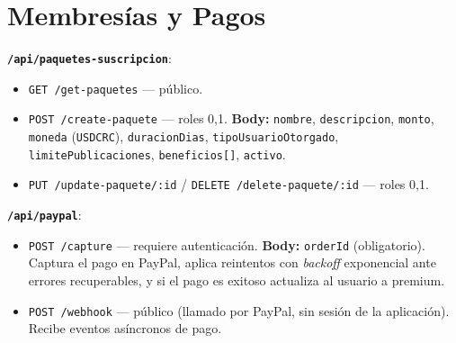 \section{Membresías y Pagos}
\textbf{\texttt{/api/paquetes-suscripcion}}:
\begin{itemize}
    \item \texttt{GET /get-paquetes} — público.
    \item \texttt{POST /create-paquete} — roles 0,1. \textbf{Body:} \texttt{nombre}, \texttt{descripcion}, \texttt{monto}, \texttt{moneda} (\texttt{USD}\textbar\texttt{CRC}), \texttt{duracionDias}, \texttt{tipoUsuarioOtorgado}, \texttt{limitePublicaciones}, \texttt{beneficios[]}, \texttt{activo}.
    \item \texttt{PUT /update-paquete/:id} / \texttt{DELETE /delete-paquete/:id} — roles 0,1.
\end{itemize}
\textbf{\texttt{/api/paypal}}:
\begin{itemize}
    \item \texttt{POST /capture} — requiere autenticación. \textbf{Body:} \texttt{orderId} (obligatorio). Captura el pago en PayPal, aplica reintentos con \textit{backoff} exponencial ante errores recuperables, y si el pago es exitoso actualiza al usuario a premium.
    \item \texttt{POST /webhook} — público (llamado por PayPal, sin sesión de la aplicación). Recibe eventos asíncronos de pago.
\end{itemize}

